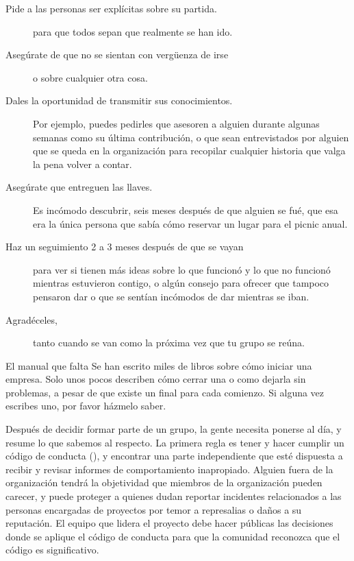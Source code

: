 \begin{description}

\item[Pide a las personas ser explícitas sobre su partida.]
  para que todos sepan que realmente se han ido.

\item[Asegúrate de que no se sientan con vergüenza de irse]
  o sobre cualquier otra cosa.

\item[Dales la oportunidad de transmitir sus conocimientos.]
  Por ejemplo,
  puedes pedirles que asesoren a alguien durante algunas semanas como su última contribución,
  o que sean entrevistados por alguien que se queda en la organización para recopilar cualquier historia que valga la pena volver a contar.

\item[Asegúrate que entreguen las llaves.]
  Es incómodo descubrir, seis meses después de que alguien se fué,
  que esa era la única persona que sabía cómo reservar un lugar para el picnic anual.

\item[Haz un seguimiento 2 a 3 meses después de que se vayan]
  para ver si tienen más ideas sobre lo que funcionó y lo que no funcionó mientras estuvieron contigo,
  o algún consejo para ofrecer que tampoco pensaron dar
  o que se sentían incómodos de dar mientras se iban.

\item[Agradéceles,]
  tanto cuando se van como la próxima vez que tu grupo se reúna.

\end{description}

\begin{aside}{El manual que falta}
  Se han escrito miles de libros sobre cómo iniciar una empresa.
  Solo unos pocos describen cómo cerrar una o como dejarla sin problemas,
  a pesar de que existe un final para cada comienzo.
  Si alguna vez escribes uno,
  por favor házmelo saber.
\end{aside}


Después de decidir formar parte de un grupo,
la gente necesita ponerse al día,
y \cite{Shol2019} resume lo que sabemos al respecto.
La primera regla es tener y hacer cumplir un código de conducta (),
y encontrar una parte independiente que esté dispuesta a recibir y revisar informes de comportamiento inapropiado.
Alguien fuera de la organización tendrá la objetividad que miembros de la organización pueden carecer,
y puede proteger a quienes dudan reportar incidentes relacionados a las personas
encargadas de proyectos por temor a represalias o daños a su reputación.
El equipo que lidera el proyecto debe hacer públicas las decisiones donde se aplique el código de conducta
para que la comunidad reconozca que el código es significativo.

